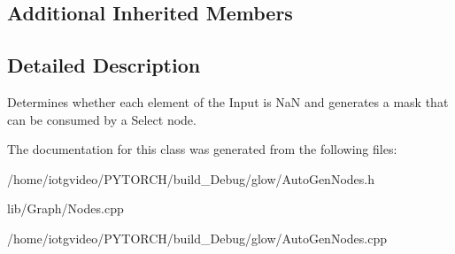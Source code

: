 \subsection*{Additional Inherited Members}


\subsection{Detailed Description}
Determines whether each element of the Input is NaN and generates a mask that can be consumed by a Select node. 

The documentation for this class was generated from the following files\+:\begin{DoxyCompactItemize}
\item 
/home/iotgvideo/\+P\+Y\+T\+O\+R\+C\+H/build\+\_\+\+Debug/glow/Auto\+Gen\+Nodes.\+h\item 
lib/\+Graph/Nodes.\+cpp\item 
/home/iotgvideo/\+P\+Y\+T\+O\+R\+C\+H/build\+\_\+\+Debug/glow/Auto\+Gen\+Nodes.\+cpp\end{DoxyCompactItemize}
